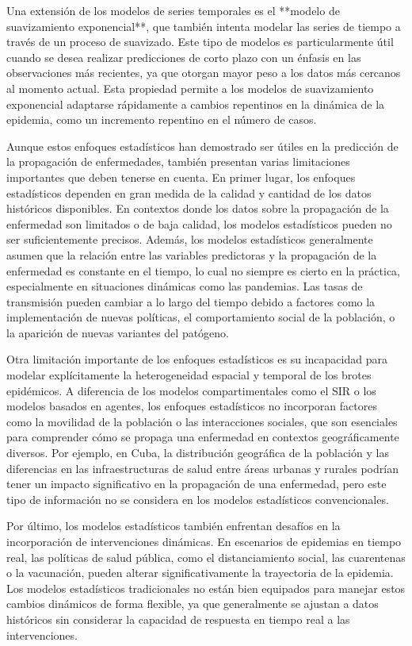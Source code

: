 Una extensión de los modelos de series temporales es el **modelo de suavizamiento exponencial**, que también intenta modelar las series de tiempo a través de un proceso de suavizado. Este tipo de modelos es particularmente útil cuando se desea realizar predicciones de corto plazo con un énfasis en las observaciones más recientes, ya que otorgan mayor peso a los datos más cercanos al momento actual. Esta propiedad permite a los modelos de suavizamiento exponencial adaptarse rápidamente a cambios repentinos en la dinámica de la epidemia, como un incremento repentino en el número de casos.

Aunque estos enfoques estadísticos han demostrado ser útiles en la predicción de la propagación de enfermedades, también presentan varias limitaciones importantes que deben tenerse en cuenta. En primer lugar, los enfoques estadísticos dependen en gran medida de la calidad y cantidad de los datos históricos disponibles. En contextos donde los datos sobre la propagación de la enfermedad son limitados o de baja calidad, los modelos estadísticos pueden no ser suficientemente precisos. Además, los modelos estadísticos generalmente asumen que la relación entre las variables predictoras y la propagación de la enfermedad es constante en el tiempo, lo cual no siempre es cierto en la práctica, especialmente en situaciones dinámicas como las pandemias. Las tasas de transmisión pueden cambiar a lo largo del tiempo debido a factores como la implementación de nuevas políticas, el comportamiento social de la población, o la aparición de nuevas variantes del patógeno.

Otra limitación importante de los enfoques estadísticos es su incapacidad para modelar explícitamente la heterogeneidad espacial y temporal de los brotes epidémicos. A diferencia de los modelos compartimentales como el SIR o los modelos basados en agentes, los enfoques estadísticos no incorporan factores como la movilidad de la población o las interacciones sociales, que son esenciales para comprender cómo se propaga una enfermedad en contextos geográficamente diversos. Por ejemplo, en Cuba, la distribución geográfica de la población y las diferencias en las infraestructuras de salud entre áreas urbanas y rurales podrían tener un impacto significativo en la propagación de una enfermedad, pero este tipo de información no se considera en los modelos estadísticos convencionales.

Por último, los modelos estadísticos también enfrentan desafíos en la incorporación de intervenciones dinámicas. En escenarios de epidemias en tiempo real, las políticas de salud pública, como el distanciamiento social, las cuarentenas o la vacunación, pueden alterar significativamente la trayectoria de la epidemia. Los modelos estadísticos tradicionales no están bien equipados para manejar estos cambios dinámicos de forma flexible, ya que generalmente se ajustan a datos históricos sin considerar la capacidad de respuesta en tiempo real a las intervenciones.

